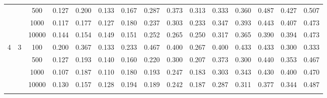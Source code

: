 \documentclass[12pt]{article}
\begin{document}
{\begin{longtable}{ccccccccccccccc}
      &   & 500 & 0.127 & 0.200 & 0.133 & 0.167 & 0.287 & 0.373 & 0.313 & 0.333 & 0.360 & 0.487 & 0.427 & 0.507 \\
      &   & 1000 & 0.117 & 0.177 & 0.127 & 0.180 & 0.237 & 0.303 & 0.233 & 0.347 & 0.393 & 0.443 & 0.407 & 0.473 \\
      &   & 10000 & 0.144 & 0.154 & 0.149 & 0.151 & 0.252 & 0.265 & 0.250 & 0.317 & 0.365 & 0.390 & 0.394 & 0.473 \\
    \hline
    4 & 3 & 100 & 0.200 & 0.367 & 0.133 & 0.233 & 0.467 & 0.400 & 0.267 & 0.400 & 0.433 & 0.433 & 0.300 & 0.333 \\
      &   & 500 & 0.127 & 0.193 & 0.140 & 0.160 & 0.220 & 0.300 & 0.207 & 0.373 & 0.300 & 0.440 & 0.353 & 0.467 \\
      &   & 1000 & 0.107 & 0.187 & 0.110 & 0.180 & 0.193 & 0.247 & 0.183 & 0.303 & 0.343 & 0.430 & 0.400 & 0.470 \\
      &   & 10000 & 0.130 & 0.157 & 0.128 & 0.194 & 0.189 & 0.242 & 0.187 & 0.287 & 0.311 & 0.377 & 0.344 & 0.487 \\
    \hline
    \label{tab:misclassification_errors}
\end{longtable}
}
\end{document}

